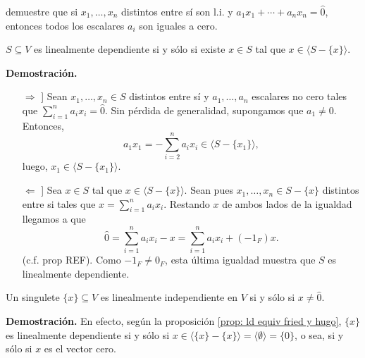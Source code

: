  demuestre que 
si $x_{1}, \ldots , x_{n}$ distintos entre sí son l.i. y
$a_{1} x_{1} + \cdots + a_{n} x_{n} = \hat{0}$, entonces todos
los escalares $a_{i}$ son iguales a cero.


\begin{prop}
	\label{prop: ld equiv fried y hugo}
$S \subseteq V$ es linealmente dependiente si y sólo si 
existe $x \in S$ tal que $x \in \langle S - \{ x \} \rangle$.
\end{prop}
\noindent
\textbf{Demostración.}
\begin{itemize}
	\item[$\Rightarrow$]] Sean $x_{1},\ldots , x_{n} \in S$
	distintos entre sí y $a_{1}, \ldots , a_{n}$ escalares no cero 
	tales que $\sum_{i=1}^{n} a_{i}x_{i} = \hat{0}$.
	Sin pérdida de generalidad, supongamos que 
	$a_{1} \neq 0$. Entonces,
	\[
	a_{1}x_{1} = - \sum_{i=2}^{n} a_{i}x_{i} \in 
	\langle S - \{ x_{1} \} \rangle,
	\]
	luego, $x_{1} \in \langle S -\{ x_{1} \} \rangle$.
	\item[$\Leftarrow$]] Sea $x \in S$ tal que 
	$x \in \langle S - \{ x \} \rangle$. Sean pues
	$x_{1}, \ldots ,x_{n} \in S - \{ x \}$ distintos
	entre si 
	tales que $x = \sum_{i = 1}^{n} a_{i}x_{i}$. Restando $x$
	de ambos lados de la igualdad llegamos a que
	\[
	\hat{0} = \sum_{i = 1}^{n} a_{i}x_{i} - x
	= \sum_{i = 1}^{n} a_{i}x_{i} + (-1_{F}) x.
	\]
	(c.f. prop REF). Como $-1_{F} \neq 0_{F}$, esta última
	igualdad muestra que $S$ es linealmente dependiente.
	
\end{itemize}

\QEDB
\vspace{0.2cm}

\begin{prop}
	\label{prop: singulete x l.i. sii x no cero}
Un singulete $\{ x \} \subseteq V$ es linealmente independiente en $V$
si y sólo si $x \neq \hat{0}$.
\end{prop}
\noindent
\textbf{Demostración.}
En efecto, según la proposición
\ref{prop: ld equiv fried y hugo},
$\{ x \}$ es linealmente dependiente si y sólo si 
$x \in \langle \{ x \} - \{ x \} \rangle = 
\langle \emptyset \rangle = \{ 0 \}$, 
o sea, si y sólo si $x$ es el vector cero.
\QEDB
\vspace{0.2cm}


